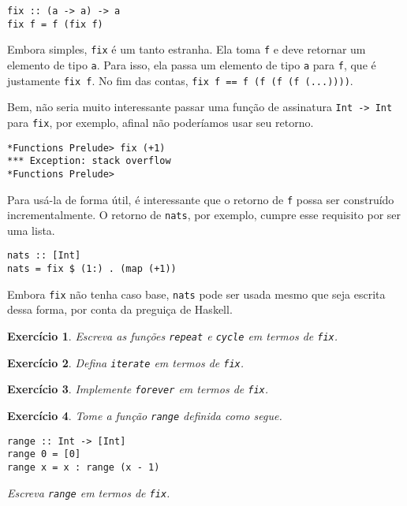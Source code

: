 \documentclass[a4paper]{article}
\newtheorem{exercicio}{Exercício}
\begin{document}
\begin{verbatim}
fix :: (a -> a) -> a
fix f = f (fix f)
\end{verbatim}

Embora simples, \texttt{fix} é um tanto estranha.
Ela toma \texttt{f} e deve retornar um elemento de tipo \texttt{a}.
Para isso, ela passa um elemento de tipo \texttt{a} para \texttt{f}, que é justamente \texttt{fix f}.
No fim das contas, \texttt{fix f == f (f (f (f (...))))}.

Bem, não seria muito interessante passar uma função de assinatura \texttt{Int -> Int} para \texttt{fix}, por exemplo, afinal não poderíamos usar seu retorno.

\begin{verbatim}
*Functions Prelude> fix (+1)
*** Exception: stack overflow
*Functions Prelude>
\end{verbatim}

Para usá-la de forma útil, é interessante que o retorno de \texttt{f} possa ser construído incrementalmente.
O retorno de \texttt{nats}, por exemplo, cumpre esse requisito por ser uma lista.

\begin{verbatim}
nats :: [Int]
nats = fix $ (1:) . (map (+1))
\end{verbatim}

Embora \texttt{fix} não tenha caso base, \texttt{nats} pode ser usada mesmo que seja escrita dessa forma, por conta da preguiça de Haskell.

\begin{exercicio}
	Escreva as funções \emph{\texttt{repeat}} e \emph{\texttt{cycle}} em termos de \emph{\texttt{fix}}.
\end{exercicio}

\begin{exercicio}
	Defina \emph{\texttt{iterate}} em termos de \emph{\texttt{fix}}.
\end{exercicio}

\begin{exercicio}
	Implemente \emph{\texttt{forever}} em termos de \emph{\texttt{fix}}.
\end{exercicio}

\pagebreak

\begin{exercicio}
	Tome a função \emph{\texttt{range}} definida como segue.
\begin{verbatim}
range :: Int -> [Int]
range 0 = [0]
range x = x : range (x - 1)
\end{verbatim}
	Escreva \emph{\texttt{range}} em termos de \emph{\texttt{fix}}.
\end{exercicio}
\end{document}

